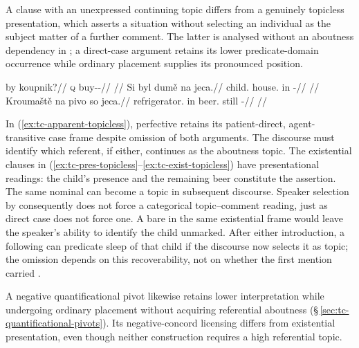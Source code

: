 A clause with an unexpressed continuing topic differs from a genuinely
 topicless presentation, which asserts a situation without selecting an
 individual as the subject matter of a further comment. The latter is
 analysed without an aboutness dependency in ; a direct-case
 argument retains its lower predicate-domain occurrence while ordinary
 placement supplies its pronounced position.

\pex\label{ex:tc-topicless}
\a\label{ex:tc-apparent-topicless}%
\begingl
\gla by koupnik?//
\glb \textsc{q} buy-\Trs{}-\Pf{}//
\glft {}
      //
\endgl
\a\label{ex:tc-pres-topicless}%
\begingl
\gla Si byl dumě na jeca.//
\glb \Sanch{} child.\Dir{} house.\Ind{} in \Exst{}-\Cont{}//
\glft {}
      //
\endgl
\a\label{ex:tc-exist-topicless}%
\begingl
\gla Kroumaště na pivo so jeca.//
\glb refrigerator.\Ind{} in beer.\Dir{} still \Exst{}-\Cont{}//
\glft {}
      //
\endgl
\xe

\noindent In (\ref{ex:tc-apparent-topicless}), perfective 
 retains its patient-direct, agent-transitive case frame despite omission of
 both arguments. The discourse must identify which referent, if either,
 continues as the aboutness topic. The existential clauses in
 (\ref{ex:tc-pres-topicless}--\ref{ex:tc-exist-topicless}) have presentational
 readings: the child's presence and the remaining beer constitute the
 assertion. The same nominal can become a topic in subsequent discourse.
 Speaker selection by  consequently does not force a categorical
 topic--comment reading, just as direct case does not force one. A bare
  in the same existential frame would leave the speaker's ability
 to identify the child unmarked. After either introduction, a following
   can predicate sleep of that
 child if the discourse now selects it as topic; the omission depends on
 this recoverability, not on whether the first mention carried .

A negative quantificational pivot likewise retains lower interpretation
 while undergoing ordinary placement without acquiring referential aboutness (§\,\ref{sec:tc-quantificational-pivots}).
 Its negative-concord licensing differs from existential presentation, even
 though neither construction requires a high referential topic.

